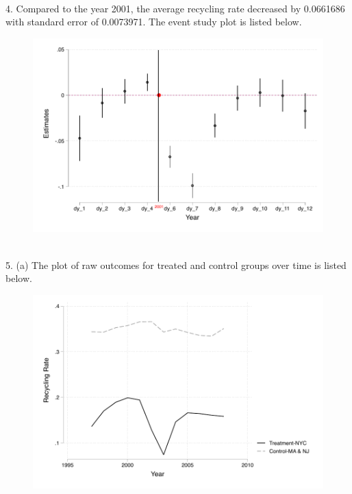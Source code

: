 \documentclass{article}
\begin{document}
~\\
4. Compared to the year 2001, the average recycling rate decreased by 0.0661686 with standard error of 0.0073971. The event study plot is listed below. 
\begin{figure}[H]
\centering
\includegraphics[scale = 0.9]{question4.pdf}	
\end{figure}


~\\
5. (a) The plot of raw outcomes for treated and control groups over time is listed below.
\begin{figure}[H]
\centering
\includegraphics[scale = 0.9]{question5a.pdf}	
\end{figure}
~\\
\end{document}
